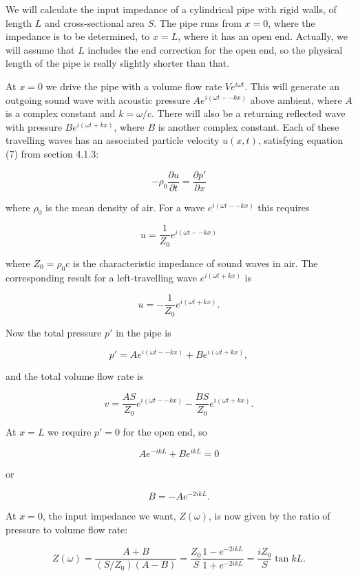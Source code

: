   We will calculate the input impedance of a cylindrical pipe with rigid walls, 
  of length $L$ and cross-sectional area $S$. The pipe runs from $x=0$, where 
  the impedance is to be determined, to $x=L$, where it has an open end. 
  Actually, we will assume that $L$ includes the end correction for the open 
  end, so the physical length of the pipe is really slightly shorter than that. 

  At $x=0$ we drive the pipe with a volume flow rate $Ve^{i \omega t}$. This 
  will generate an outgoing sound wave with acoustic pressure $Ae^{i(\omega t 
  -- kx)}$ above ambient, where $A$ is a complex constant and $k=\omega/c$. 
  There will also be a returning reflected wave with pressure $Be^{i(\omega t + 
  kx)}$, where $B$ is another complex constant. Each of these travelling waves 
  has an associated particle velocity $u(x,t)$, satisfying equation (7) from 
  section 4.1.3: 

  $$-\rho_0 \dfrac{\partial u}{\partial t} = \dfrac{\partial p'}{\partial x} 
  \tag{1}$$ 

  where $\rho_0$ is the mean density of air. For a wave $e^{i(\omega t -- kx)}$ 
  this requires 

  $$u=\dfrac{1}{Z_0}e^{i(\omega t -- kx)} \tag{2}$$ 

  where $Z_0=\rho_0 c$ is the characteristic impedance of sound waves in air. 
  The corresponding result for a left-travelling wave $e^{i(\omega t + kx)}$ is 

  $$u=-\dfrac{1}{Z_0}e^{i(\omega t + kx)} . \tag{3}$$ 

  Now the total pressure $p'$ in the pipe is 

  $$p'=Ae^{i(\omega t -- kx)}+Be^{i(\omega t + kx)} , \tag{4}$$ 

  and the total volume flow rate is 

  $$v=\dfrac{AS}{Z_0}e^{i(\omega t -- kx)}-\dfrac{BS}{Z_0}e^{i(\omega t + kx)} 
  . \tag{5}$$ 

  At $x=L$ we require $p'=0$ for the open end, so 

  $$Ae^{-ikL} +Be^{ikL} =0 \tag{6}$$ 

  or 

  $$B=-Ae^{-2ikL} . \tag{7}$$ 

  At $x=0$, the input impedance we want, $Z(\omega)$, is now given by the ratio 
  of pressure to volume flow rate: 

  $$Z(\omega)=\dfrac{A+B}{(S/Z_0) 
  (A-B)}=\dfrac{Z_0}{S}\dfrac{1-e^{-2ikL}}{1+e^{-2ikL}}=\dfrac{iZ_0}{S}\tan kL 
  . \tag{8}$$ 

